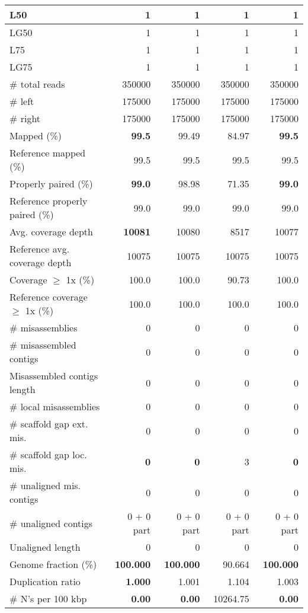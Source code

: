 \documentclass[12pt,a4paper]{article}
\begin{document}
\begin{table}[ht]
\begin{center}
\begin{tabular}{|l*{4}{|r}|}
L50 & 1 & 1 & 1 & 1 \\ \hline
LG50 & 1 & 1 & 1 & 1 \\ \hline
L75 & 1 & 1 & 1 & 1 \\ \hline
LG75 & 1 & 1 & 1 & 1 \\ \hline
\# total reads & 350000 & 350000 & 350000 & 350000 \\ \hline
\# left & 175000 & 175000 & 175000 & 175000 \\ \hline
\# right & 175000 & 175000 & 175000 & 175000 \\ \hline
Mapped (\%) & {\bf 99.5} & 99.49 & 84.97 & {\bf 99.5} \\ \hline
Reference mapped (\%) & 99.5 & 99.5 & 99.5 & 99.5 \\ \hline
Properly paired (\%) & {\bf 99.0} & 98.98 & 71.35 & {\bf 99.0} \\ \hline
Reference properly paired (\%) & 99.0 & 99.0 & 99.0 & 99.0 \\ \hline
Avg. coverage depth & {\bf 10081} & 10080 & 8517 & 10077 \\ \hline
Reference avg. coverage depth & 10075 & 10075 & 10075 & 10075 \\ \hline
Coverage $\geq$ 1x (\%) & 100.0 & 100.0 & 90.73 & 100.0 \\ \hline
Reference coverage $\geq$ 1x (\%) & 100.0 & 100.0 & 100.0 & 100.0 \\ \hline
\# misassemblies & 0 & 0 & 0 & 0 \\ \hline
\# misassembled contigs & 0 & 0 & 0 & 0 \\ \hline
Misassembled contigs length & 0 & 0 & 0 & 0 \\ \hline
\# local misassemblies & 0 & 0 & 0 & 0 \\ \hline
\# scaffold gap ext. mis. & 0 & 0 & 0 & 0 \\ \hline
\# scaffold gap loc. mis. & {\bf 0} & {\bf 0} & 3 & {\bf 0} \\ \hline
\# unaligned mis. contigs & 0 & 0 & 0 & 0 \\ \hline
\# unaligned contigs & 0 + 0 part & 0 + 0 part & 0 + 0 part & 0 + 0 part \\ \hline
Unaligned length & 0 & 0 & 0 & 0 \\ \hline
Genome fraction (\%) & {\bf 100.000} & {\bf 100.000} & 90.664 & {\bf 100.000} \\ \hline
Duplication ratio & {\bf 1.000} & 1.001 & 1.104 & 1.003 \\ \hline
\# N's per 100 kbp & {\bf 0.00} & {\bf 0.00} & 10264.75 & {\bf 0.00} \\ \hline

\end{tabular}
\end{center}
\end{table}
\end{document}
